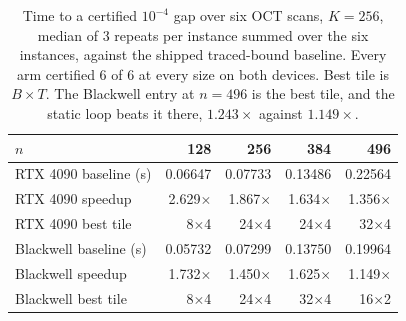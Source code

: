 \begin{table}[t]
\centering
\caption{Time to a certified $10^{-4}$ gap over six OCT scans, $K=256$, median
of 3 repeats per instance summed over the six instances, against the shipped
traced-bound baseline. Every arm certified 6 of 6 at every size on both
devices. Best tile is $B \times T$. The Blackwell entry at $n=496$ is the best
tile, and the static loop beats it there, $1.243\times$ against
$1.149\times$.}
\label{tab:intro-e2e}
\begin{tabular}{lrrrr}
\toprule
$n$ & 128 & 256 & 384 & 496 \\
\midrule
RTX 4090 baseline (s)  & 0.06647 & 0.07733 & 0.13486 & 0.22564 \\
RTX 4090 speedup       & 2.629$\times$ & 1.867$\times$ & 1.634$\times$ & 1.356$\times$ \\
RTX 4090 best tile     & 8$\times$4 & 24$\times$4 & 24$\times$4 & 32$\times$4 \\
\midrule
Blackwell baseline (s) & 0.05732 & 0.07299 & 0.13750 & 0.19964 \\
Blackwell speedup      & 1.732$\times$ & 1.450$\times$ & 1.625$\times$ & 1.149$\times$ \\
Blackwell best tile    & 8$\times$4 & 24$\times$4 & 32$\times$4 & 16$\times$2 \\
\bottomrule
\end{tabular}
\end{table}

